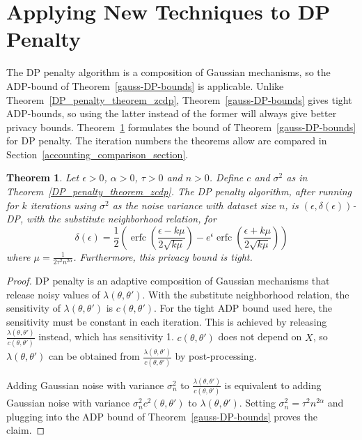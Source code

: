 \documentclass[english,twoside,openright]{HYgraduMLDS}
\newtheorem{theorem}{Theorem}
\DeclareMathOperator{\erfc}{erfc}
\begin{document}
\section{Applying New Techniques to DP Penalty}\label{dp_penalty_adp_section}

The DP penalty algorithm is a composition of Gaussian mechanisms, so
the ADP-bound of Theorem~\ref{gauss-DP-bounds} is applicable. Unlike
Theorem~\ref{DP_penalty_theorem_zcdp}, Theorem~\ref{gauss-DP-bounds}
gives tight ADP-bounds, so using the latter instead of the former will
always give better privacy bounds. Theorem~\ref{DP_penalty_theorem_adp}
formulates the bound of Theorem~\ref{gauss-DP-bounds} for DP penalty.
The iteration numbers the theorems allow are compared in
Section~\ref{accounting_comparison_section}.

\begin{theorem}\label{DP_penalty_theorem_adp}
    Let \(\epsilon > 0\), \(\alpha > 0\), \(\tau > 0\) and \(n > 0\).
    Define \(c\) and \(\sigma^{2}\) as in Theorem~\ref{DP_penalty_theorem_zcdp}.
    The DP penalty algorithm, after running for \(k\) iterations using \(\sigma^{2}\)
    as the noise variance with dataset size \(n\),
    is \((\epsilon, \delta(\epsilon))\)-DP, with the substitute neighborhood
    relation, for
    \[
        \delta(\epsilon) 
        = \frac{1}{2}\left(
            \erfc\left(\frac{\epsilon - k\mu}{2\sqrt{k\mu}}\right)
            - e^\epsilon \erfc\left(\frac{\epsilon + k\mu}{2\sqrt{k\mu}}\right)
        \right)
    \]
    where \(\mu = \frac{1}{2\tau^2 n^{2\alpha}}\). Furthermore, this privacy
    bound is tight.
\end{theorem}
\begin{proof}
    DP penalty is an adaptive composition of Gaussian mechanisms that release 
    noisy values of \(\lambda(\theta, \theta')\). With the substitute neighborhood
    relation, the sensitivity of \(\lambda(\theta, \theta')\) is
    \(c(\theta, \theta')\). For the tight ADP bound used here, the sensitivity must be 
    constant in each iteration. This is achieved by releasing 
    \(\frac{\lambda(\theta, \theta')}{c(\theta, \theta')}\) instead, which 
    has sensitivity 1. \(c(\theta, \theta')\) does not depend on \(X\), 
    so \(\lambda(\theta, \theta')\) can be obtained from 
    \(\frac{\lambda(\theta, \theta')}{c(\theta, \theta')}\) by post-processing.

    Adding Gaussian noise with variance \(\sigma_n^2\) to 
    \(\frac{\lambda(\theta, \theta')}{c(\theta, \theta')}\)
    is equivalent to adding Gaussian noise with variance 
    \(\sigma_n^2 c^2(\theta, \theta')\) to \(\lambda(\theta, \theta')\).
    Setting \(\sigma_n^2 = \tau^2n^{2\alpha}\) and plugging into 
    the ADP bound of Theorem~\ref{gauss-DP-bounds} proves the 
    claim.
\end{proof}
\end{document}
